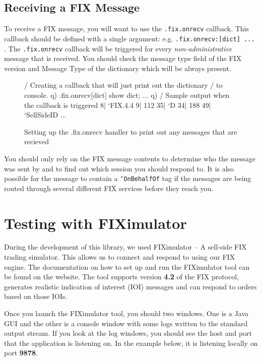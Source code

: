 \subsection{Receiving a FIX Message}

To receive a FIX message, you will want to use the \texttt{.fix.onrecv} callback. This callback should be defined with a single argument: e.g. \texttt{.fix.onrecv:{[dict] ... }}. The \texttt{.fix.onrecv} callback will be triggered for every \textit{non-administrative} message that is received. You should check the message type field of the FIX version and Message Type of the dictionary which will be always present.

\begin{figure}[H]
\begin{qcode}
/ Creating a callback that will just print out the dictionary
/ to console.
q) .fix.onrecv{[dict] show dict; }
...
q)
/ Sample output when the callback is triggered
8|  `FIX.4.4
9|  112
35| `D
34| 188
49| `SellSideID
...
\end{qcode}
\caption{Setting up the .fix.onrecv handler to print out any messages that are recieved}
\end{figure}

You should only rely on the FIX message contents to determine who the message was sent by and to find out which session you should respond to. It is also possible for the message to contain
a \texttt{`OnBehalfOf} tag if the messages are being routed through several different
FIX services before they reach you.

\section{Testing with FIXimulator}

During the development of this library, we used FIXimulator -- A sell-side FIX trading simulator. This
allows us to connect and respond to using our FIX engine. The documentation on how to set up and run
the FIXimulator tool can be found on the website. The tool supports version \textbf{4.2} of the FIX protocol, generates realistic indication of interest (IOI) messages and can respond to orders based on those IOIs.

Once you launch the FIXimulator tool, you should two windows. One is a Java GUI and the other is a console window with some logs written to the standard output stream. If you look at the log windows, you should see the host and port that the application is listening on. In the example below, it is listening locally on port \textbf{9878}.

